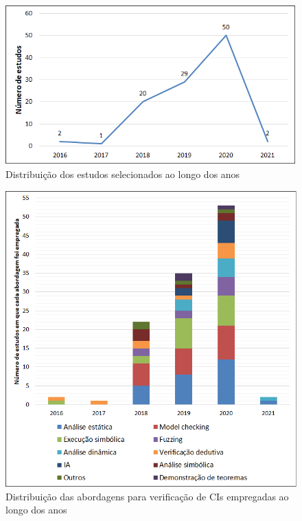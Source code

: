 \begin{figure}[!htb]
 \caption{Distribuição dos estudos selecionados ao longo dos anos}
 \label{fig:rq2-distribuicao-estudos}
 \centering
 \includegraphics[scale=0.6]{figuras/rq2-distribuicao-estudos.png}
 \fdadospesquisa
\end{figure}

\begin{figure}[!htb]
 \caption{Distribuição das abordagens para verificação de CIs empregadas ao longo dos anos}
 \label{fig:rq2-distribuicao-abordagens}
 \centering
 \includegraphics[scale=0.6]{figuras/rq2-distribuicao-abordagens.png}
 \fdadospesquisa
\end{figure}

